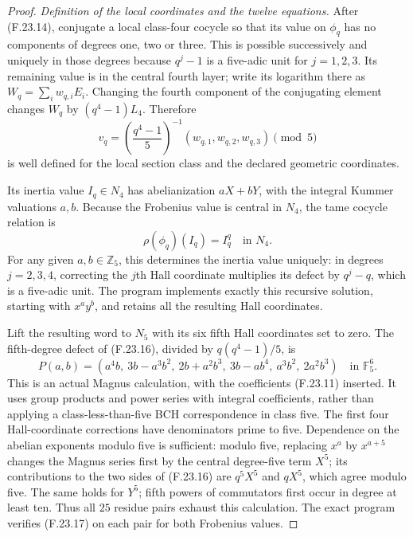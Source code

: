\begin{proof}
\emph{Definition of the local coordinates and the twelve equations.}
After (F.23.14), conjugate a local class-four cocycle
so that its value on \(\phi_q\) has no components of
degrees one, two or three. This is possible successively
and uniquely in those degrees because \(q^j-1\) is a
five-adic unit for \(j=1,2,3\).
Its remaining value is in the central fourth layer;
write its logarithm there as \(W_q=\sum_i w_{q,i}E_i\).
Changing the fourth component of the conjugating element
changes \(W_q\) by \((q^4-1)L_4\). Therefore
\[
 v_q=\left(\frac{q^4-1}{5}\right)^{-1}
                    (w_{q,1},w_{q,2},w_{q,3})\pmod5          \tag{F.23.15}
\]
is well defined for the local section class and the
declared geometric coordinates.

Its inertia value \(I_q\in N_4\) has abelianization
\(aX+bY\), with the integral Kummer valuations \(a,b\).
Because the Frobenius value is central in \(N_4\),
the tame cocycle relation is
\[
                   \rho(\phi_q)(I_q)=I_q^q\quad\text{in }N_4.
                                                               \tag{F.23.16}
\]
For any given \(a,b\in\mathbb Z_5\), this determines the
inertia value uniquely: in degrees \(j=2,3,4\), correcting
the \(j\)th Hall coordinate multiplies its defect by
\(q^j-q\), which is a five-adic unit.
The program implements exactly this recursive solution,
starting with \(x^ay^b\), and retains all the resulting
Hall coordinates.

Lift the resulting word to \(N_5\) with its six fifth
Hall coordinates set to zero. The fifth-degree defect
of (F.23.16), divided by \(q(q^4-1)/5\), is
\[
 P(a,b)=
 (a^4b,\ 3b-a^3b^2,\ 2b+a^2b^3,\ 3b-ab^4,\
                                  a^3b^2,\ 2a^2b^3)
                      \quad\text{in }\mathbb F_5^6.           \tag{F.23.17}
\]
This is an actual Magnus calculation, with the coefficients
(F.23.11) inserted. It uses group products and power series
with integral coefficients, rather than applying a
class-less-than-five BCH correspondence in class five.
The first four Hall-coordinate corrections have denominators
prime to five. Dependence on the abelian exponents modulo
five is sufficient: modulo five, replacing \(x^a\) by
\(x^{a+5}\) changes the Magnus series first by the central
degree-five term \(X^5\); its contributions to the two
sides of (F.23.16) are \(q^5X^5\) and \(qX^5\), which
agree modulo five. The same holds for \(Y^5\); fifth
powers of commutators first occur in degree at least ten.
Thus all \(25\) residue pairs exhaust this calculation.
The exact program verifies (F.23.17) on each pair for
both Frobenius values.


\end{proof}
